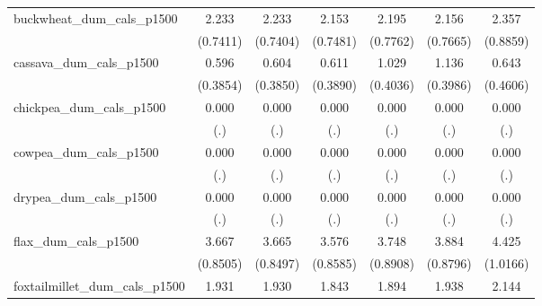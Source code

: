 {\begin{tabular}{l*{6}{c}}
\addlinespace
buckwheat\_dum\_cals\_p1500&       2.233\sym{**} &       2.233\sym{**} &       2.153\sym{**} &       2.195\sym{**} &       2.156\sym{**} &       2.357\sym{**} \\
                    &    (0.7411)         &    (0.7404)         &    (0.7481)         &    (0.7762)         &    (0.7665)         &    (0.8859)         \\
\addlinespace
cassava\_dum\_cals\_p1500&       0.596         &       0.604         &       0.611         &       1.029\sym{*}  &       1.136\sym{**} &       0.643         \\
                    &    (0.3854)         &    (0.3850)         &    (0.3890)         &    (0.4036)         &    (0.3986)         &    (0.4606)         \\
\addlinespace
chickpea\_dum\_cals\_p1500&       0.000         &       0.000         &       0.000         &       0.000         &       0.000         &       0.000         \\
                    &         (.)         &         (.)         &         (.)         &         (.)         &         (.)         &         (.)         \\
\addlinespace
cowpea\_dum\_cals\_p1500&       0.000         &       0.000         &       0.000         &       0.000         &       0.000         &       0.000         \\
                    &         (.)         &         (.)         &         (.)         &         (.)         &         (.)         &         (.)         \\
\addlinespace
drypea\_dum\_cals\_p1500&       0.000         &       0.000         &       0.000         &       0.000         &       0.000         &       0.000         \\
                    &         (.)         &         (.)         &         (.)         &         (.)         &         (.)         &         (.)         \\
\addlinespace
flax\_dum\_cals\_p1500 &       3.667\sym{***}&       3.665\sym{***}&       3.576\sym{***}&       3.748\sym{***}&       3.884\sym{***}&       4.425\sym{***}\\
                    &    (0.8505)         &    (0.8497)         &    (0.8585)         &    (0.8908)         &    (0.8796)         &    (1.0166)         \\
\addlinespace
foxtailmillet\_dum\_cals\_p1500&       1.931\sym{**} &       1.930\sym{**} &       1.843\sym{*}  &       1.894\sym{*}  &       1.938\sym{*}  &       2.144\sym{*}  \\

\end{tabular}}
